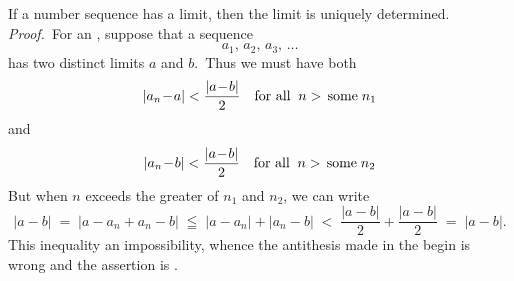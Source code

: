 \documentclass[12pt]{article}
\theoremstyle{definition}
\begin{document}
If a number sequence has a limit, then the limit is uniquely determined.\\

\emph{Proof.}\, For an , suppose that a sequence
$$a_1,\,a_2,\,a_3,\,\ldots$$
has two distinct limits $a$ and $b$.\, Thus we must have both
$$|a_n\!-\!a| < \frac{|a\!-\!b|}{2} \quad \mbox{for all}\;\; n > \mbox{\,some\;} n_1$$
and
$$|a_n\!-\!b| < \frac{|a\!-\!b|}{2} \quad \mbox{for all}\;\; n > \mbox{\,some\;} n_2$$
But when $n$ exceeds the greater of $n_1$ and $n_2$, we can write
$$|a\!-\!b| \;=\; |a\!-\!a_n\!+\!a_n\!-\!b|\;\leqq\; |a\!-\!a_n|+|a_n\!-\!b| 
\;<\; \frac{|a\!-\!b|}{2}+\frac{|a\!-\!b|}{2} \;=\; |a\!-\!b|.$$
This inequality  an impossibility, whence the antithesis made in the begin is wrong and the assertion is .

\end{document}
